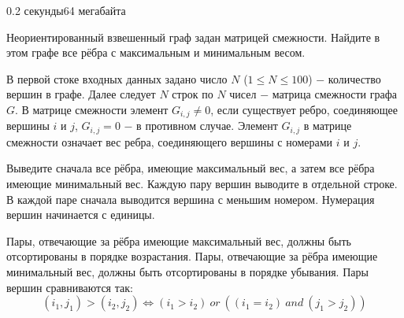 \begin{problem}{}{}{}{0.2 секунды}{64 мегабайта}

Неориентированный взвешенный граф задан матрицей смежности. Найдите в этом графе все рёбра с максимальным и минимальным
весом.

\InputFile
В первой стоке входных данных задано число $N$ ($1 \le N \le 100$) $-$ количество вершин в графе.
Далее следует $N$ строк по $N$ чисел $-$ матрица смежности графа $G$. В матрице смежности элемент $G_{i,j} \ne 0$, если
существует ребро, соединяющее вершины $i$ и $j$, $G_{i,j}=0$ $-$ в противном случае. Элемент $G_{i,j}$ в матрице
смежности означает вес ребра, соединяющего вершины с номерами $i$ и $j$.

\OutputFile
Выведите сначала все рёбра, имеющие максимальный вес, а затем все рёбра имеющие минимальный вес.
Каждую пару вершин выводите в отдельной строке. В каждой паре сначала выводится вершина с меньшим номером.
Нумерация вершин начинается с единицы.

Пары, отвечающие за рёбра имеющие максимальный вес, должны быть отсортированы в порядке возрастания.
Пары, отвечающие за рёбра имеющие минимальный вес, должны быть отсортированы в порядке убывания.
Пары вершин сравниваются так: 
$$ (i_1, j_1) > (i_2, j_2) \Leftrightarrow (i_1 > i_2) \ or \ ((i_1=i_2) \ and \ (j_1>j_2))$$

\Example

\begin{example}
%
\end{example}

\end{problem}

